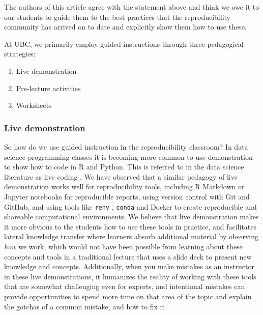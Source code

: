 \documentclass[
  12 pt,
]{paper}
\providecommand{\tightlist}{%
  \setlength{\itemsep}{0pt}\setlength{\parskip}{0pt}}
\begin{document}
The authors of this article agree with the statement above
and think we owe it to our students to guide them
to the best practices that the reproducibility community has
arrived on to date and explicitly show them how to use these.

At UBC,
we primarily employ guided instructions through three pedagogical strategies:

\begin{enumerate}
\def\labelenumi{\arabic{enumi}.}
\tightlist
\item
  Live demonstration
\item
  Pre-lecture activities
\item
  Worksheets
\end{enumerate}

\hypertarget{live-demonstration}{%
\subsubsection{Live demonstration}\label{live-demonstration}}

So how do we use guided instruction in the reproducibility classroom?
In data science programming classes it is becoming more common to use demonstration
to show how to code in R and Python.
This is referred to in the data science literature as live coding
\autocite{raj2018role,nederbragt2020ten}.
We have observed that a similar pedagogy of live demonstration
works well for reproducibility tools,
including R Markdown \autocite{xie2021dynamic} or Jupyter notebooks \autocite{kluyver2016jupyter} for reproducible reports,
using version control with Git and GitHub,
and using tools like \texttt{renv} \autocite{kusheyrenv}, \texttt{conda} \autocite{anaconda}
and Docker \autocite{merkel2014docker} to create reproducible and shareable computational environments.
We believe that live demonstration makes it more obvious to the students
how to use these tools in practice,
and facilitates lateral knowledge transfer
where learners absorb additional material by observing \emph{how} we work,
which would not have been possible from learning about these
concepts and tools in a traditional lecture that uses a slide deck
to present new knowledge and concepts.
Additionally, when you make mistakes as an instructor in these live demonstrations,
it humanizes the reality of working with these tools that are
somewhat challenging even for experts,
and intentional mistakes can provide opportunities to spend more time on
that area of the topic and explain the gotchas of a common mistake,
and how to fix it \autocite{wilson_wilson_2018}.
\end{document}
